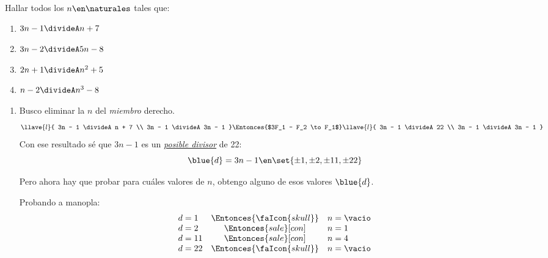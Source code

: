 \def\enumeracion{\alph*)}
\begin{enunciado}{\ejercicio}
  Hallar todos los $n \en \naturales$ tales que:
  \begin{multicols}{2}
    \begin{enumerate}[label=\enumeracion]
      \item $3n - 1 \divideA n+7$
      \item $3n -2 \divideA 5n - 8$
      \item $2n+1 \divideA n^2 + 5$
      \item $n-2 \divideA n^3 - 8$
    \end{enumerate}
  \end{multicols}
\end{enunciado}

\begin{enumerate}[label=\enumeracion]
  \item
        Busco eliminar la $n$ del \textit{miembro} derecho.
        $$
          \llave{l}{
            3n - 1 \divideA n + 7 \\
            3n - 1 \divideA 3n - 1
          }
          \Entonces{$3F_1 - F_2 \to F_1$}
          \llave{l}{
            3n - 1 \divideA 22 \\
            3n - 1 \divideA 3n - 1
          }
        $$
        Con ese resultado sé que $3n -1$ es un \textit{\underline{posible divisor}} de 22:
        $$
          \blue{d} = 3n - 1 \en \set{\pm1,\pm2, \pm11, \pm22}
        $$

        Pero ahora hay que probar para cuáles valores de $n$, obtengo alguno de esos valores $\blue{d}$.

        Probando a manopla:
        $$
          \begin{array}{lcl}
            d = 1  & \Entonces{\faIcon{skull}} & n = \vacio \\
            d = 2  & \Entonces{sale}[con]      & n = 1      \\
            d = 11 & \Entonces{sale}[con]      & n = 4      \\
            d = 22 & \Entonces{\faIcon{skull}} & n = \vacio
          \end{array}
        $$


\end{enumerate}
